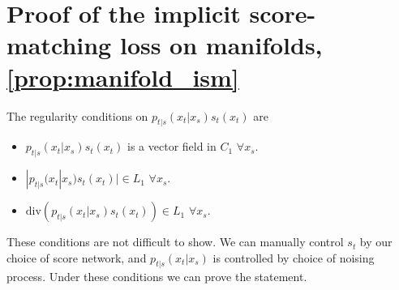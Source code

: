 \section{Proof of the implicit score-matching loss on manifolds, \cref{prop:manifold_ism}}
\label{sec:manifold_ism_proof}

The regularity conditions on \(p_{t|s}(x_t|x_s)s_t(x_t)\) are \begin{itemize} \item \(p_{t|s}(x_t|x_s)s_t(x_t)\) is a vector field in \(C_1\) \(\forall x_s\).
	\item \(|p_{t|s}(x_t|x_s)s_t(x_t)| \in L_1\) \(\forall x_s\).
	\item \(\mathrm{div}(p_{t|s}(x_t|x_s)s_t(x_t)) \in L_1\) \(\forall x_s\).
\end{itemize}
These conditions are not difficult to show.
We can manually control \(s_t\) by our choice of score network, and \(p_{t|s}(x_t|x_s)\) is controlled by choice of noising process.
Under these conditions we can prove the statement.

